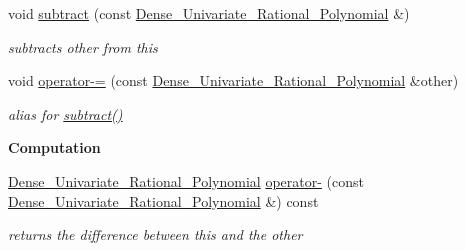 \begin{Indent}
\begin{DoxyCompactItemize}
\mbox{\label{group__polygroup_aab4902fd7521146ea739f9f3f8c0c8b6}} 
void \hyperlink{group__polygroup_aab4902fd7521146ea739f9f3f8c0c8b6}{subtract} (const \hyperlink{group__polygroup_class_dense___univariate___rational___polynomial}{Dense\+\_\+\+Univariate\+\_\+\+Rational\+\_\+\+Polynomial} \&)
\begin{DoxyCompactList}\small\item\em subtracts {\ttfamily other} from {\ttfamily this} \end{DoxyCompactList}\item 
\mbox{\label{group__polygroup_a7bb6d8ed216e5575773013a19052e79c}} 
void \hyperlink{group__polygroup_a7bb6d8ed216e5575773013a19052e79c}{operator-\/=} (const \hyperlink{group__polygroup_class_dense___univariate___rational___polynomial}{Dense\+\_\+\+Univariate\+\_\+\+Rational\+\_\+\+Polynomial} \&other)
\begin{DoxyCompactList}\small\item\em alias for \hyperlink{group__polygroup_aab4902fd7521146ea739f9f3f8c0c8b6}{subtract()} \end{DoxyCompactList}\end{DoxyCompactItemize}
\end{Indent}
\begin{Indent}\textbf{ Computation}\par
\begin{DoxyCompactItemize}
\item 
\mbox{\label{group__polygroup_a91d98d134a32b9089b6af40fc35c809f}} 
\hyperlink{group__polygroup_class_dense___univariate___rational___polynomial}{Dense\+\_\+\+Univariate\+\_\+\+Rational\+\_\+\+Polynomial} \hyperlink{group__polygroup_a91d98d134a32b9089b6af40fc35c809f}{operator-\/} (const \hyperlink{group__polygroup_class_dense___univariate___rational___polynomial}{Dense\+\_\+\+Univariate\+\_\+\+Rational\+\_\+\+Polynomial} \&) const
\begin{DoxyCompactList}\small\item\em returns the difference between {\ttfamily this} and the other \end{DoxyCompactList}\end{DoxyCompactItemize}
\end{Indent}
